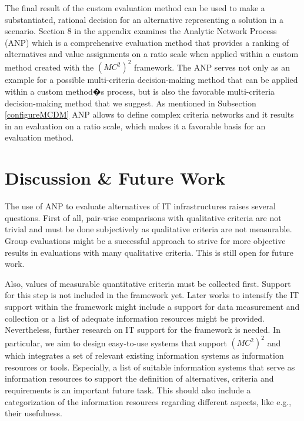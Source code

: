 \documentclass[journal,final,a4paper,twoside]{IEEEtran}
\begin{document}
The final result of the custom evaluation method can be used to make a substantiated, rational decision for an alternative representing a solution in a scenario.
Section 8 in the appendix examines the Analytic Network Process (ANP) which is a comprehensive evaluation method that provides a ranking of alternatives and value assignments on a ratio scale when applied within a custom method created with the $(MC^2)^2$ framework. The ANP serves not only as an example for a possible multi-criteria decision-making method that can be applied within a custom method�s process, but is also the favorable multi-criteria decision-making method that we suggest. As mentioned in Subsection \ref{configureMCDM} ANP allows to define complex criteria networks and it results in an evaluation on a ratio scale, which makes it a favorable basis for an evaluation method.


















\section{Discussion \& Future Work}
\label{discussfuture}
The use of ANP to evaluate alternatives of IT infrastructures raises several questions. First of all, pair-wise comparisons with qualitative criteria are not trivial and must be done subjectively as qualitative criteria are not measurable. Group evaluations might be a successful approach to strive for more objective results in evaluations with many qualitative criteria. This is still open for future work.

Also, values of measurable quantitative criteria must be collected first. Support for this step is not included in the framework yet. Later works to intensify the IT support within the framework might include a support for data measurement and collection or a list of adequate information resources might be provided. Nevertheless, further research on IT support for the framework is needed. In particular, we aim to design easy-to-use systems that support $(MC^2)^2$ and which integrates a set of relevant existing information systems as information resources or tools. Especially, a list of suitable information systems that serve as information resources to support the definition of alternatives, criteria and requirements is an important future task. This should also include a categorization of the information resources regarding different aspects, like e.g., their usefulness.
\end{document}
